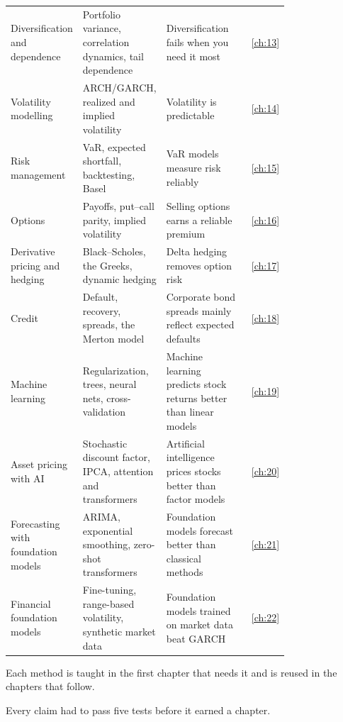 \begin{longtable}{@{}>{\raggedright\arraybackslash}p{0.198\linewidth}>{\raggedright\arraybackslash}p{0.288\linewidth}>{\raggedright\arraybackslash}p{0.297\linewidth}r@{}}
Diversification and dependence & Portfolio variance, correlation dynamics, tail dependence & Diversification fails when you need it most & \ref{ch:13} \\
Volatility modelling & ARCH/GARCH, realized and implied volatility & Volatility is predictable & \ref{ch:14} \\
Risk management & VaR, expected shortfall, backtesting, Basel & VaR models measure risk reliably & \ref{ch:15} \\
Options & Payoffs, put--call parity, implied volatility & Selling options earns a reliable premium & \ref{ch:16} \\
Derivative pricing and hedging & Black--Scholes, the Greeks, dynamic hedging & Delta hedging removes option risk & \ref{ch:17} \\
Credit & Default, recovery, spreads, the Merton model & Corporate bond spreads mainly reflect expected defaults & \ref{ch:18} \\
Machine learning & Regularization, trees, neural nets, cross-validation & Machine learning predicts stock returns better than linear models & \ref{ch:19} \\
Asset pricing with AI & Stochastic discount factor, IPCA, attention and transformers & Artificial intelligence prices stocks better than factor models & \ref{ch:20} \\
Forecasting with foundation models & ARIMA, exponential smoothing, zero-shot transformers & Foundation models forecast better than classical methods & \ref{ch:21} \\
Financial foundation models & Fine-tuning, range-based volatility, synthetic market data & Foundation models trained on market data beat GARCH & \ref{ch:22} \\
\end{longtable}
\endgroup

Each method is taught in the first chapter that needs it and is reused in the chapters that follow.

Every claim had to pass five tests before it earned a chapter.

